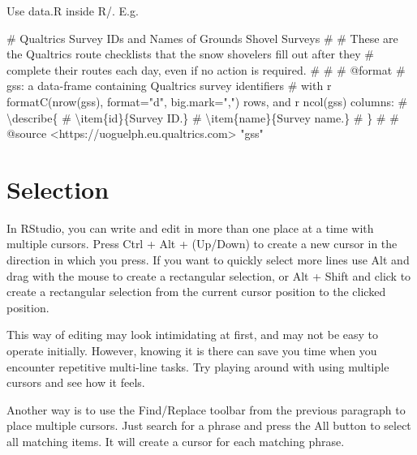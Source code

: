 \documentclass[
  letterpaper,
  DIV=11,
  numbers=noendperiod,
  oneside]{scrreprt}
\newenvironment{Shaded}{\begin{snugshade}}{\end{snugshade}}
\newcommand{\CommentTok}[1]{\textcolor[rgb]{0.37,0.37,0.37}{#1}}
\newcommand{\StringTok}[1]{\textcolor[rgb]{0.13,0.47,0.30}{#1}}
\begin{document}
Use data.R inside R/. E.g.

\begin{Shaded}
\begin{Highlighting}[]
\CommentTok{\#\textquotesingle{} Qualtrics Survey ID\textquotesingle{}s and Names of Grounds Shovel Surveys}
\CommentTok{\#\textquotesingle{}}
\CommentTok{\#\textquotesingle{} These are the Qualtrics route checklists that the snow shovelers fill out after they}
\CommentTok{\#\textquotesingle{} complete their routes each day, even if no action is required.}
\CommentTok{\#\textquotesingle{}}
\CommentTok{\#\textquotesingle{}}
\CommentTok{\#\textquotesingle{} @format}
\CommentTok{\#\textquotesingle{} \textasciigrave{}gss\textasciigrave{}: a data{-}frame containing Qualtrics survey identifiers}
\CommentTok{\#\textquotesingle{}  with \textasciigrave{}r formatC(nrow(gss), format="d", big.mark=",")\textasciigrave{} rows, and \textasciigrave{}r ncol(gss)\textasciigrave{} columns:}
\CommentTok{\#\textquotesingle{} \textbackslash{}describe\{}
\CommentTok{\#\textquotesingle{}   \textbackslash{}item\{id\}\{Survey ID.\}}
\CommentTok{\#\textquotesingle{}   \textbackslash{}item\{name\}\{Survey name.\}}
\CommentTok{\#\textquotesingle{}   \}}
\CommentTok{\#\textquotesingle{}}
\CommentTok{\#\textquotesingle{} @source \textless{}https://uoguelph.eu.qualtrics.com\textgreater{}}
\StringTok{"gss"}
\end{Highlighting}
\end{Shaded}

\hypertarget{selection}{%
\section{Selection}\label{selection}}

In RStudio, you can write and edit in more than one place at a time with
multiple cursors. Press Ctrl + Alt + (Up/Down) to create a new cursor in
the direction in which you press. If you want to quickly select more
lines use Alt and drag with the mouse to create a rectangular selection,
or Alt + Shift and click to create a rectangular selection from the
current cursor position to the clicked position.

This way of editing may look intimidating at first, and may not be easy
to operate initially. However, knowing it is there can save you time
when you encounter repetitive multi-line tasks. Try playing around with
using multiple cursors and see how it feels.

Another way is to use the Find/Replace toolbar from the previous
paragraph to place multiple cursors. Just search for a phrase and press
the All button to select all matching items. It will create a cursor for
each matching phrase.
\end{document}
